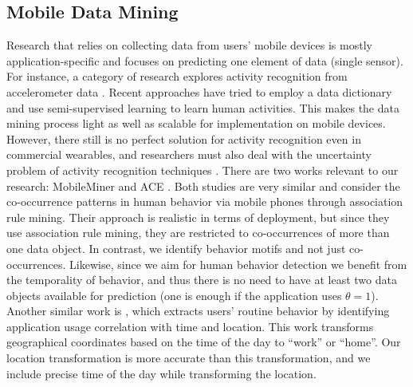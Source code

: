 \documentclass{sig-alternate}
\begin{document}
\subsection{Mobile Data Mining}
Research that relies on collecting data from users' mobile devices is mostly application-specific and focuses on predicting one element of data (single sensor). For instance, a category of research explores activity recognition from accelerometer data \cite{unlabelsparse, activitytaxonomy, genmodautrec}. Recent approaches \cite{unlabelsparse} have tried to employ a data dictionary and use semi-supervised learning to learn human activities. This makes the data mining process light  as well as scalable for implementation on mobile devices. However, there still is no perfect solution for activity recognition even in commercial wearables, and researchers must also deal with the uncertainty problem of activity recognition techniques \cite{validity}. There are two works relevant to our research: MobileMiner \cite{mobileminer} and ACE \cite{ace}. Both studies are very similar and consider the co-occurrence patterns in human behavior via mobile phones through association rule mining. Their approach is realistic in terms of deployment, but since they use association rule mining, they are restricted to co-occurrences of more than one data object. In contrast, we identify behavior motifs and not just co-occurrences. Likewise, since we aim for human behavior detection we benefit from the temporality of behavior, and thus there is no need to have at least two data objects available for prediction (one is enough if the application uses  $\theta =1$). Another similar work is \cite{habitmin}, which extracts users' routine behavior by identifying application usage correlation with time and location. This work transforms geographical coordinates based on the time of the day to ``work'' or ``home''. Our location transformation is more accurate than this transformation, and we include precise time of the day while transforming the location.
\vspace{-0.1cm}
\end{document}
